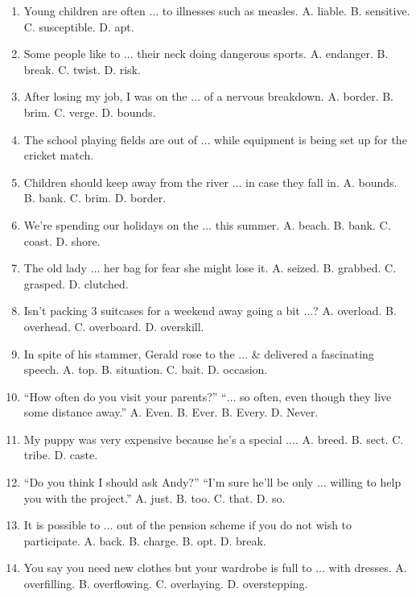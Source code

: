 \documentclass{article}
\numberwithin{equation}{section}
\begin{document}
\begin{enumerate}[leftmargin=8mm]
	\item Young children are often $\ldots$ to illnesses such as measles. {\sf A.} liable. {\sf B.} sensitive. {\sf C.} susceptible. {\sf D.} apt.
	\item Some people like to $\ldots$ their neck doing dangerous sports. {\sf A.} endanger. {\sf B.} break. {\sf C.} twist. {\sf D.} risk.
	\item After losing my job, I was on the $\ldots$ of a nervous breakdown. {\sf A.} border. {\sf B.} brim. {\sf C.} verge. {\sf D.} bounds.
	\item The school playing fields are out of $\ldots$ while equipment is being set up for the cricket match.
	\item Children should keep away from the river $\ldots$ in case they fall in. {\sf A.} bounds. {\sf B.} bank. {\sf C.} brim. {\sf D.} border.
	\item We're spending our holidays on the $\ldots$ this summer. {\sf A.} beach. {\sf B.} bank. {\sf C.} coast. {\sf D.} shore.
	\item The old lady $\ldots$ her bag for fear she might lose it. {\sf A.} seized. {\sf B.} grabbed. {\sf C.} grasped. {\sf D.} clutched.
	\item Isn't packing 3 suitcases for a weekend away going a bit $\ldots$? {\sf A.} overload. {\sf B.} overhead. {\sf C.} overboard. {\sf D.} overskill.
	\item In spite of his stammer, Gerald rose to the $\ldots$ \& delivered a fascinating speech. {\sf A.} top. {\sf B.} situation. {\sf C.} bait. {\sf D.} occasion.
	\item ``How often do you visit your parents?'' ``$\ldots$ so often, even though they live some distance away.'' {\sf A.} Even. {\sf B.} Ever. {\sf B.} Every. {\sf D.} Never.
	\item My puppy was very expensive because he's a special $\ldots$. {\sf A.} breed. {\sf B.} sect. {\sf C.} tribe. {\sf D.} caste.
	\item ``Do you think I should ask Andy?'' ``I'm sure he'll be only $\ldots$ willing to help you with the project.'' {\sf A.} just. {\sf B.} too. {\sf C.} that. {\sf D.} so.
	\item It is possible to $\ldots$ out of the pension scheme if you do not wish to participate. {\sf A.} back. {\sf B.} charge. {\sf B.} opt. {\sf D.} break.
	\item You say you need new clothes but your wardrobe is full to $\ldots$ with dresses. {\sf A.} overfilling. {\sf B.} overflowing. {\sf C.} overlaying. {\sf D.} overstepping.

\end{enumerate}
\end{document}
